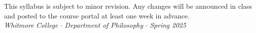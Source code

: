 \vspace{8pt}
\begin{center}
  {\small\color{muted}
    This syllabus is subject to minor revision. Any changes will be announced in class and
    posted to the course portal at least one week in advance.\\[2pt]
    \textit{Whitmore College $\cdot$ Department of Philosophy $\cdot$ Spring 2025}}
\end{center}
